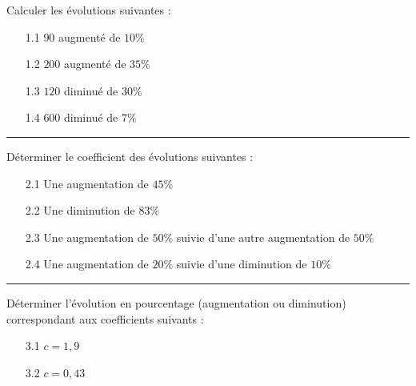 \documentclass{beamer}
\begin{document}
\footnotesize

\begin{frame}
	Calculer les évolutions suivantes :

	\begin{itemize}
		\item[1.1] $90$ augmenté de $10\%$
		\item[1.2] $200$ augmenté de $35\%$
		\item[1.3] $120$ diminué de $30\%$
		\item[1.4] $600$ diminué de $7\%$
	\end{itemize}

	\vspace{1em}\hrule\vspace{1em}

	Déterminer le coefficient des évolutions suivantes :

	\begin{enumerate}
		\item[2.1] Une augmentation de $45\%$
		\item[2.2] Une diminution de $83\%$
		\item[2.3] Une augmentation de $50\%$  suivie d'une autre augmentation de $50\%$
		\item[2.4] Une augmentation de $20\%$ suivie d'une diminution de $10\%$
	\end{enumerate}

	\vspace{1em}\hrule\vspace{1em}


	Déterminer l'évolution en pourcentage (augmentation ou diminution) correspondant aux coefficients suivants :
	\begin{itemize}
		\item[3.1] $c = 1,9$
		\item[3.2] $c = 0,43$
	\end{itemize}
\end{frame}
\end{document}

